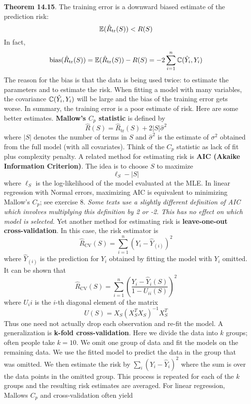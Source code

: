 \textbf{Theorem 14.15}. The training error is a downward biased estimate
of the prediction risk:
\[
\operatorname{\mathbb{E}}(\hat{R}_\text{tr}(S)) < R(S)
\]
In fact,
\[
\text{bias}(\hat{R}_\text{tr}(S)) = \operatorname{\mathbb{E}}(\hat{R}_\text{tr}(S)) - R(S) = -2 \sum_{i=1}^{n} \operatorname{\mathbb{C}}(\hat{Y}_{i}, Y_{i})
\]
The reason for the bias is that the data is being used twice: to
estimate the parameters and to estimate the risk. When fitting a model
with many variables, the covariance \(\operatorname{\mathbb{C}}(\hat{Y_{i}}, Y_{i})\) will
be large and the bias of the training error gets worse.
In summary, the training error is a poor estimate of risk. Here are some
better estimates.
\textbf{Mallow's \(C_p\) statistic} is defined by
\[
\hat{R}(S) = \hat{R}_\text{tr}(S) + 2 |S| \hat{\sigma}^{2}
\]
where \(|S|\) denotes the number of terms in \(S\) and
\(\hat{\sigma}^{2}\) is the estimate of \(\sigma^{2}\) obtained from the
full model (with all covariates). Think of the \(C_p\) statistic as lack
of fit plus complexity penalty.
A related method for estimating risk is \textbf{AIC (Akaike Information
Criterion)}. The idea is to choose \(S\) to maximize
\[
\ell_S - |S|
\]
where \(\ell_S\) is the log-likelihood of the model evaluated at the
MLE. In linear regression with Normal errors, maximizing AIC is
equivalent to minimizing Mallow's \(C_p\); see exercise 8.
\emph{Some texts use a slightly different definition of AIC which
involves multiplying this definition by 2 or -2. This has no effect on
which model is selected.}
Yet another method for estimating risk is \textbf{leave-one-out
cross-validation}. In this case, the risk estimator is
\[
\hat{R}_\text{CV}(S) = \sum_{i=1}^{n} (Y_{i} - \hat{Y}_{(i)})^{2}
\]
where \(\hat{Y}_{(i)}\) is the prediction for \(Y_{i}\) obtained by
fitting the model with \(Y_{i}\) omitted. It can be shown that
\[
\hat{R}_\text{CV}(S) = \sum_{i=1}^{n} \left( \frac{Y_{i} - \hat{Y}_{i}(S)}{1 - U_{ii}(S)} \right)^{2}
\]
where \(U_{i}i\) is the \(i\)-th diagonal element of the matrix
\[
U(S) = X_S (X_S^T X_S)^{-1} X_S^T
\]
Thus one need not actually drop each observation and re-fit the model.
A generalization is \textbf{k-fold cross-validation}. Here we divide the
data into \(k\) groups; often people take \(k = 10\). We omit one group
of data and fit the models on the remaining data. We use the fitted
model to predict the data in the group that was omitted. We then
estimate the risk by \(\sum_{i} (Y_{i} - \hat{Y}_{i})^{2}\) where the sum is
over the data points in the omitted group. This process is repeated for
each of the \(k\) groups and the resulting risk estimates are averaged.
For linear regression, Mallows \(C_p\) and cross-validation often yield
